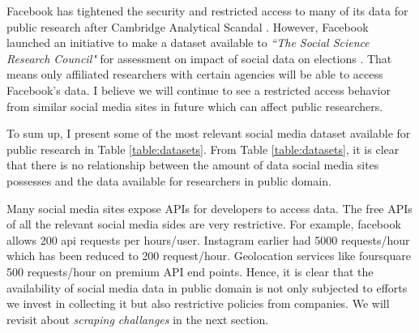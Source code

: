 Facebook has tightened the security and restricted access to many of its data for public research after Cambridge Analytical Scandal \cite{cambridge_analytica, fb_data}. However, Facebook launched an initiative to make a dataset available to {\em ``The Social Science Research Council"} for assessment on impact of social data on elections \cite{fb_initiative}. That means only affiliated researchers with certain agencies will be able to access Facebook's data. I believe we will continue to see a restricted access behavior from similar social media sites in future which can affect public researchers.

To sum up, I present some of the most relevant social media dataset available for public research in Table \ref{table:datasets}. From Table \ref{table:datasets}, it is clear that there is no relationship between the amount of data social media sites possesses and the data available for researchers in public domain.

Many social media sites expose APIs for developers to access data. The free APIs of all the relevant social media sides are very restrictive. For example, facebook allows 200 api requests per hours/user. Instagram earlier had 5000 requests/hour which has been reduced to 200 request/hour. Geolocation services like foursquare 500 requests/hour on premium API end points. Hence, it is clear that the availability of social media data in public domain is not only subjected to efforts we invest in collecting it but also restrictive policies from companies. We will revisit about {\em scraping challanges} in the next section.

